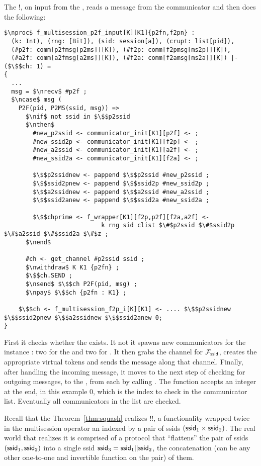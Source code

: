 The !\F, on input from the \partywrapper, reads a message from the communicator and then does the following:
\begin{lstlisting}[basicstyle=\footnotesize\BeraMonottFamily, frame=single, mathescape]
$\nproc$ f_multisession_p2f_input[K][K1]{p2fn,f2pn} : 
  (k: Int), (rng: [Bit]), (sid: session[a]), (crupt: list[pid]),
  (#p2f: comm[p2fmsg[p2ms]][K]), (#f2p: comm[f2pmsg[ms2p]][K]), 
  (#a2f: comm[a2fmsg[a2ms]][K]), (#f2a: comm[f2amsg[ms2a]][K]) |- ($\$$ch: 1) =
{
  ...
  msg = $\nrecv$ #p2f ;
  $\ncase$ msg (
    P2F(pid, P2MS(ssid, msg)) =>
      $\nif$ not ssid in $\$$p2ssid
      $\nthen$
      	#new_p2ssid <- communicator_init[K1][p2f] <- ;
      	#new_ssid2p <- communicator_init[K1][f2p] <- ;
      	#new_a2ssid <- communicator_init[K1][a2f] <- ;
      	#new_ssid2a <- communicator_init[K1][f2a] <- ;
      
      	$\$$p2ssidnew <- pappend $\$$p2ssid #new_p2ssid ;
      	$\$$ssid2pnew <- pappend $\$$ssid2p #new_ssid2p ;
      	$\$$a2ssidnew <- pappend $\$$a2ssid #new_a2ssid ;
      	$\$$ssid2anew <- pappend $\$$ssid2a #new_ssid2a ;
      
      	$\$$chprime <- f_wrapper[K1][f2p,p2f][f2a,a2f] <- 
                           k rng sid clist $\#$p2ssid $\#$ssid2p $\#$a2ssid $\#$ssid2a $\#$z ;
      $\nend$
  
      #ch <- get_channel #p2ssid ssid ;
      $\nwithdraw$ K K1 {p2fn} ;
      $\$$ch.SEND ;
      $\nsend$ $\$$ch P2F(pid, msg) ;
      $\npay$ $\$$ch {p2fn : K1} ;
  	
    $\$$ch <- f_multisession_f2p_i[K][K1] <- .... $\$$p2ssidnew $\$$ssid2pnew $\$$a2ssidnew $\$$ssid2anew 0;	
}
\end{lstlisting}

First it checks whether the  exists. It not it spawns new communicators for the instance \F: two for the \partywrapper and two for \A.
It then grabs the  channel for $\mathcal{F}_{\mathsf{ssid}}$, creates the appropriate virtual tokens and sends the message along that channel.
Finally, after handling the incoming message, it moves to the next step of checking for outgoing messages, to the \partywrapper, from each \F by calling .
The function accepts an integer at the end, in this example 0, which is the index to check in the communicator list. Eventually all communicators in the list are checked.

Recall that the Theorem~\ref{thm:squash} realizes !!\F, a functionality wrapped twice in the multisession operator an indexed by a pair of ssids $(\mathsf{ssid}_1 \times \mathsf{ssid}_2)$.
The real world that realizes it is comprised of a protocol that ``flattens'' the pair of ssids $(\mathsf{ssid}_1, \mathsf{ssid}_2)$ into a single ssid $\mathsf{ssid}_3 = \mathsf{ssid}_1 || \mathsf{ssid}_2$, the concatenation (can be any other one-to-one and invertible function on the pair) of them.


